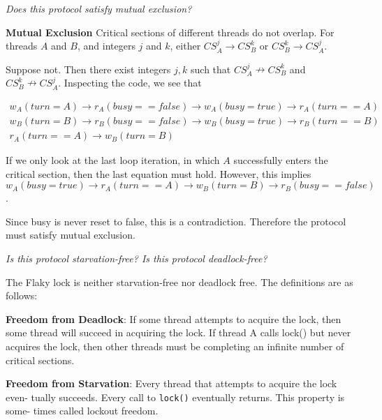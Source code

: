 \documentclass[a4paper,10pt]{article}
\begin{document}
\emph{Does this protocol satisfy mutual exclusion?}

\vspace{3mm}

\textbf{Mutual Exclusion} Critical sections of different threads do not overlap. For
threads $A$ and $B$, and integers $j$ and $k$, either $CS_A^j \rightarrow CS_B^k$ or $CS_B^k \rightarrow CS_A^j$.

\vspace{3mm}

Suppose not. Then there exist integers $j, k$ such that $CS_A^j \nrightarrow CS_B^k$ and
$CS_B^k \nrightarrow CS_A^j$. Inspecting the code, we see that

\begin{gather*}
w_A(turn = A) \rightarrow r_A(busy == false) \rightarrow w_A(busy = true) \rightarrow r_A(turn == A) \\
w_B(turn = B) \rightarrow r_B(busy == false) \rightarrow w_B(busy = true) \rightarrow r_B(turn == B) \\
r_A(turn == A) \rightarrow w_B(turn = B)
\end{gather*}

If we only look at the last loop iteration, in which $A$ successfully enters the critical
section, then the last equation must hold. However, this implies
$w_A(busy = true) \rightarrow r_A(turn == A) \rightarrow w_B(turn = B) \rightarrow r_B(busy == false)$.

Since busy is never reset to false, this is a contradiction. 
Therefore the protocol must satisfy mutual exclusion.

\vspace{3mm}

\emph{Is this protocol starvation-free? Is this protocol deadlock-free?}

\vspace{3mm}

The Flaky lock is neither starvation-free nor deadlock free. The definitions are 
as follows:

\textbf{Freedom from Deadlock}: If some thread attempts to acquire the lock, then some
thread will succeed in acquiring the lock. If thread A calls lock() but never
acquires the lock, then other threads must be completing an infinite number
of critical sections.

\textbf{Freedom from Starvation}: Every thread that attempts to acquire the lock even-
tually succeeds. Every call to \lstinline|lock()| eventually returns. This property is some-
times called lockout freedom.
\end{document}
